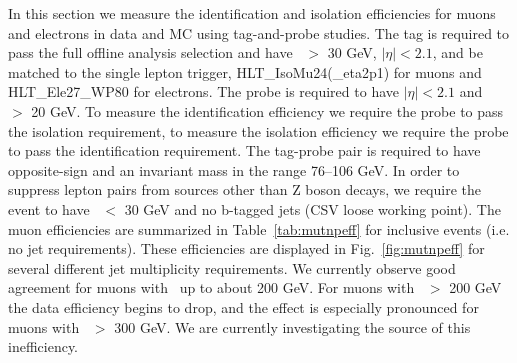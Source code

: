 In this section we measure the identification and isolation efficiencies for muons and electrons in data and MC using tag-and-probe studies. 
The tag is required to pass the full offline analysis selection and have \pt\ $>$ 30 GeV, $|\eta|<2.1$, and be matched to the single
lepton trigger, HLT\_IsoMu24(\_eta2p1) for muons and HLT\_Ele27\_WP80 for electrons. 
The probe is required to have $|\eta|<2.1$ and \pt\ $>$ 20 GeV. To measure the identification efficiency we require the probe to pass the isolation requirement,
to measure the isolation efficiency we require the probe to pass the identification requirement.
The tag-probe pair is required to have opposite-sign and an invariant mass in the range 76--106 GeV.
In order to suppress lepton pairs from sources other than Z boson decays, we require the event to have \met\ $<$ 30 GeV and no b-tagged jets (CSV loose working point).
The muon efficiencies are summarized in Table~\ref{tab:mutnpeff} for inclusive events (i.e. no jet requirements). These efficiencies are displayed in Fig.~\ref{fig:mutnpeff} for
several different jet multiplicity requirements. We currently observe good agreement for muons with \pt\ up to about 200 GeV. For muons with \pt\ $>$ 200 GeV the data efficiency
begins to drop, and the effect is especially pronounced for muons with \pt\ $>$ 300 GeV. We are currently investigating the source of this inefficiency.




